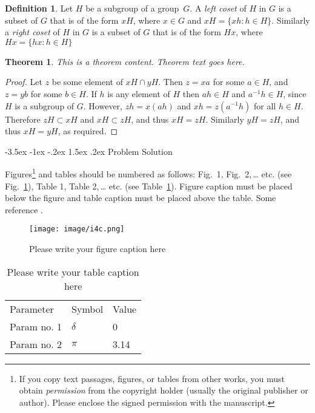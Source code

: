 \documentclass[a4paper,12pt]{article}
\makeatletter
\newtheorem*{theorem}{Theorem}
\theoremstyle{definition}
\newtheorem*{definition}{Definition}
\renewcommand\section{\@startsection {section}{1}{\z@}%
                                   {-3.5ex \@plus -1ex \@minus -.2ex}%
                                   {1.5ex \@plus.2ex}%
                                   {\large\bfseries}}
\makeatother
\begin{document}
\begin{definition}
Let $H$ be a subgroup of a group~$G$.  A \emph{left coset}
of $H$ in $G$ is a subset of $G$ that is of the form $xH$,
where $x \in G$ and $xH = \{ xh : h \in H \}$.
Similarly a \emph{right coset} of $H$ in $G$ is a subset
of $G$ that is of the form $Hx$, where
$Hx = \{ hx : h \in H \}$
\end{definition}

\begin{theorem}
This is a theorem content. Theorem text goes here. 
\end{theorem}

\begin{proof}
Let $z$ be some element of $xH \cap yH$.  Then $z = xa$
for some $a \in H$, and $z = yb$ for some $b \in H$.
If $h$ is any element of $H$ then $ah \in H$ and
$a^{-1}h \in H$, since $H$ is a subgroup of $G$.
However, $zh = x(ah)$ and $xh = z(a^{-1}h)$ for all $h \in H$.
Therefore $zH \subset xH$ and $xH \subset zH$, and thus
$xH = zH$.  Similarly $yH = zH$, and thus $xH = yH$,
as required.
\end{proof}

\section{Problem Solution}
 
\setcounter{page}{2}

Figures\footnote{If you copy text passages, figures, or tables from other works, you must obtain \textit{permission} from the copyright holder (usually the original publisher or author). Please enclose the signed permission with the manuscript.} and tables should be numbered as follows: Fig.~1,
Fig.~2,\,\dots{} etc. (see Fig.~\ref{fig:1}), Table 1, Table 2,\,\dots{} etc. (see Table~\ref{tab:1}). Figure caption must be placed below the figure and table caption must be placed above the table. Some reference \cite{SICILIANO_rhandbook}.

%
%
\begin{figure}[h]
\begin{center}
\texttt{[image: image/i4c.png]}
\caption{Please write your figure caption here}
\label{fig:1}
\end{center}
\end{figure}


%
%
\begin{table}[h] 
\begin{center}
\caption{Please write your table caption here} 
\label{tab:1}
\begin{tabular}{lll}
\hline\noalign{\smallskip}
Parameter & Symbol & Value\\
\noalign{\smallskip}
\hline\noalign{\smallskip}
Param no. 1 & $\delta$ & 0\\
Param no. 2 & $\pi$    & 3.14\\
\hline
\end{tabular}
\end{center}
\end{table}
\end{document}
